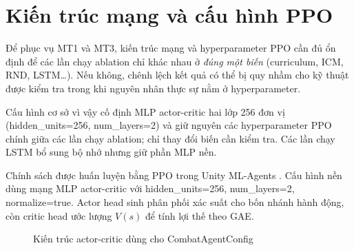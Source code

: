 \section{Kiến trúc mạng và cấu hình PPO}

Để phục vụ MT1 và MT3, kiến trúc mạng và hyperparameter PPO cần đủ ổn định để các lần chạy ablation chỉ khác nhau ở \emph{đúng một biến} (curriculum, ICM, RND, LSTM\dots). Nếu không, chênh lệch kết quả có thể bị quy nhầm cho kỹ thuật được kiểm tra trong khi nguyên nhân thực sự nằm ở hyperparameter.

Cấu hình cơ sở vì vậy cố định MLP actor-critic hai lớp 256 đơn vị (hidden\_units=256, num\_layers=2) và giữ nguyên các hyperparameter PPO chính giữa các lần chạy ablation; chỉ thay đổi biến cần kiểm tra. Các lần chạy LSTM bổ sung bộ nhớ nhưng giữ phần MLP nền.

Chính sách được huấn luyện bằng PPO trong Unity ML-Agents \cite{Juliani2018}. Cấu hình nền dùng mạng MLP actor-critic với hidden\_units=256, num\_layers=2, normalize=true. Actor head sinh phân phối xác suất cho bốn nhánh hành động, còn critic head ước lượng $V(s)$ để tính lợi thế theo GAE.

\begin{figure}[H]
    \centering
    \caption{Kiến trúc actor-critic dùng cho CombatAgentConfig}
    \label{fig:actor_critic_architecture}
\end{figure}

